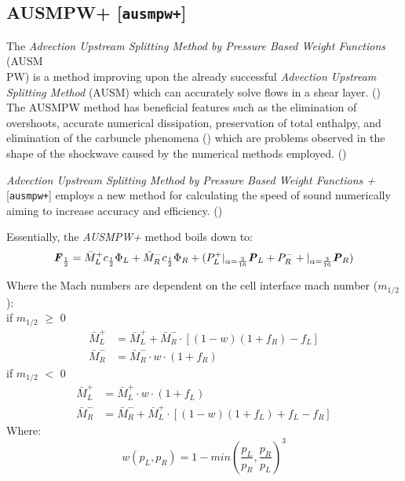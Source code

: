 \documentclass[a4paper, 12pt]{article}
\begin{document}
\subsection{AUSMPW+ [\texttt{ausmpw+}]}
The \textit{Advection Upstream Splitting Method by Pressure Based Weight Functions} (AUSM\\PW) is a method improving upon the already successful \textit{Advection Upstream Splitting Method} (AUSM) which can accurately solve flows in a shear layer. (\cite{ausmpw+}) The AUSMPW method has beneficial features such as the elimination of overshoots, accurate numerical dissipation, preservation of total enthalpy, and elimination of the carbuncle phenomena (\cite{ausmpw+}) which are problems observed in the shape of the shockwave caused by the numerical methods employed. (\cite{carbuncle}) \par
\textit{Advection Upstream Splitting Method by Pressure Based Weight Functions +} [\verb|ausmpw+|] employs a new method for calculating the speed of sound numerically aiming to increase accuracy and efficiency. (\cite{ausmpw+}) \\\par
Essentially, the \textit{AUSMPW+} method boils down to:
\begin{equation}
    \textbf{\textit{F}}_{\frac{1}{2}} = \bar M^+_Lc_\frac{1}{2}\Phi_L + \bar M^-_Rc_\frac{1}{2}\Phi_R + (P_L^+ |_{\alpha=\frac{3}{16}}\textbf{\textit{P}}_L + P_R^-+ |_{\alpha=\frac{3}{16}}\textbf{\textit{P}}_R)
\end{equation} \par
Where the Mach numbers are dependent on the cell interface mach number ($m_{1/2}$): \\
if $m_{1/2}$ $\geq$ 0
\begin{equation}
\begin{split}
    \bar M^+_L &=\bar M^+_L + \bar M^-_R\cdot[(1-w)(1+f_R)-f_L] \\
    \bar M^-_R &=\bar M^-_R\cdot w\cdot(1+f_R)
\end{split}
\end{equation}
if $m_{1/2}$ $<$ 0
\begin{equation}
\begin{split}
    \bar M^+_L &=\bar M^+_L\cdot w\cdot(1+f_L)\\
    \bar M^-_R &=\bar M^-_R + \bar M^+_L\cdot[(1-w)(1+f_L)+f_L-f_R]
\end{split}
\end{equation}
Where:
\begin{equation}
    w(p_L,p_R)=1-min\left(\dfrac{p_L}{p_R},\dfrac{p_R}{p_L} \right)^3
\end{equation}
\end{document}
